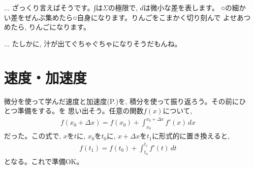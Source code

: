 

\begin{faq}{\small{}
... ざっくり言えばそうです。∫は$\Sigma$の極限で, $d$は微小な差を表します。
○の細かい差をぜんぶ集めたら○自身になります。りんごをこまかく切り刻んで
よせあつめたら, りんごになります。

... たしかに, 汁が出てぐちゃぐちゃになりそうだもんね。}\end{faq}




\section{速度・加速度}

微分を使って学んだ速度と加速度(P.\pageref{secvelocity_and_acceleration})を, 
積分を使って振り返ろう。その前にひとつ準備をする。を
思い出そう。任意の関数$f(x)$について, 
\begin{eqnarray}
f(x_0+\Delta x)=f(x_0)+\int_{x_0}^{x_0+\Delta x}f'(x)\,dx\label{eq:fb_fa_int_f'_again}
\end{eqnarray}
だった。この式で, $x$を$t$に, $x_0$を$t_0$に, $x+\Delta x$を$t_1$に形式的に置き換えると, 
\begin{eqnarray}
f(t_1)=f(t_0)+\int_{t_0}^{t_1}f'(t)\,dt\label{eq:fb_fa_int_f'_again_t}
\end{eqnarray}
となる。これで準備OK。

